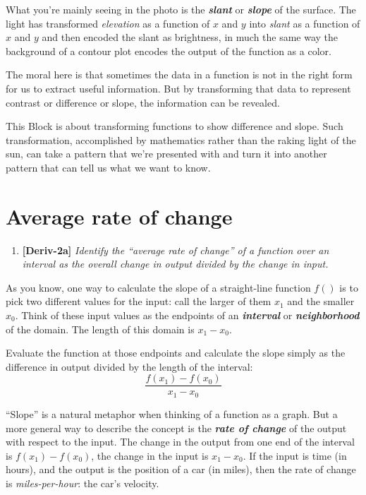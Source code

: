 \documentclass[
]{book}
\providecommand{\tightlist}{%
  \setlength{\itemsep}{0pt}\setlength{\parskip}{0pt}}
\begin{document}
What you're mainly seeing in the photo is the \textbf{\emph{slant}} or \textbf{\emph{slope}} of the surface. The light has transformed \emph{elevation} as a function of \(x\) and \(y\) into \emph{slant} as a function of \(x\) and \(y\) and then encoded the slant as brightness, in much the same way the background of a contour plot encodes the output of the function as a color.

The moral here is that sometimes the data in a function is not in the right form for us to extract useful information. But by transforming that data to represent contrast or difference or slope, the information can be revealed.

This Block is about transforming functions to show difference and slope. Such transformation, accomplished by mathematics rather than the raking light of the sun, can take a pattern that we're presented with and turn it into another pattern that can tell us what we want to know.

\hypertarget{average-rate-of-change}{%
\section{Average rate of change}\label{average-rate-of-change}}

\begin{enumerate}
\tightlist
\item
  \textbf{{[}Deriv-2a{]}} \emph{Identify the ``average rate of change'' of a function over an interval as the overall change in output divided by the change in input.}
\end{enumerate}

As you know, one way to calculate the slope of a straight-line function \(f()\) is to pick two different values for the input: call the larger of them \(x_1\) and the smaller \(x_0\). Think of these input values as the endpoints of an \textbf{\emph{interval}} or \textbf{\emph{neighborhood}} of the domain. The length of this domain is \(x_1 - x_0\).

Evaluate the function at those endpoints and calculate the slope simply as the difference in output divided by the length of the interval: \[\frac{f(x_1) - f(x_0)}{x_1 - x_0}\]

``Slope'' is a natural metaphor when thinking of a function as a graph. But a more general way to describe the concept is the \textbf{\emph{rate of change}} of the output with respect to the input. The change in the output from one end of the interval is \(f(x_1) - f(x_0)\), the change in the input is \(x_1 - x_0\). If the input is time (in hours), and the output is the position of a car (in miles), then the rate of change is \emph{miles-per-hour}: the car's velocity.
\end{document}
